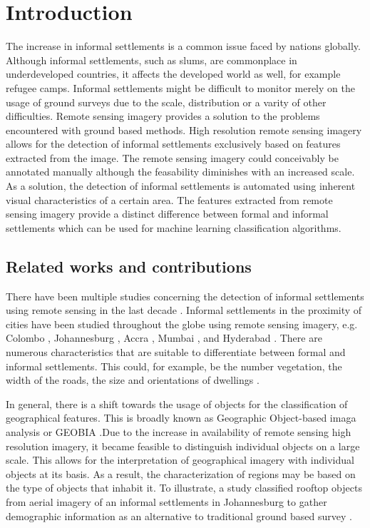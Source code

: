 \section{Introduction}

The increase in informal settlements is a common issue faced by nations
globally.  Although informal settlements, such as slums, are commonplace in
underdeveloped countries, it affects the developed world as well, for example
refugee camps. Informal settlements might be difficult to monitor merely on the
usage of ground surveys due to the scale, distribution or a varity of other
difficulties. Remote sensing imagery provides a solution to the problems
encountered with ground based methods.  High resolution remote sensing imagery
allows for the detection of informal settlements exclusively based on features
extracted from the image.  The remote sensing imagery could conceivably be
annotated manually although the feasability diminishes with an increased scale.
As a solution, the detection of informal settlements is automated using
inherent visual characteristics of a certain area. The features extracted from remote sensing imagery provide a distinct difference between formal and
informal settlements which can be used for machine learning classification
algorithms.

\subsection{Related works and contributions}

There have been multiple studies concerning the detection of informal
settlements using remote sensing in the last decade \cite{kuffer2016slums}.
Informal settlements in the proximity of cities have been studied throughout
the globe using remote sensing imagery, e.g. Colombo \cite{colombo},
Johannesburg \cite{williams2016automatic}, Accra \cite{accra}, Mumbai
\cite{mumbai}, and Hyderabad \cite{hyderabad}. There are numerous
characteristics that are suitable to differentiate between formal and informal
settlements. This could, for example,  be the number vegetation, the width of
the roads, the size and orientations of dwellings \cite{owen2013approach}.

In general, there is a shift towards the usage of objects for the
classification of geographical features. This is broadly known as Geographic
Object-based imaga analysis or GEOBIA \cite{hay2008geographic}.Due to the
increase in availability of remote sensing high resolution imagery, it became
feasible to distinguish individual objects on a large scale.  This allows for
the interpretation of geographical imagery with individual objects at its
basis.  As a result, the characterization of regions may be based on the type
of objects that inhabit it.  To illustrate, a study classified rooftop objects
from aerial imagery of an informal settlements in Johannesburg to gather
demographic information as an alternative to traditional ground based survey
\cite{williams2016automatic}.


